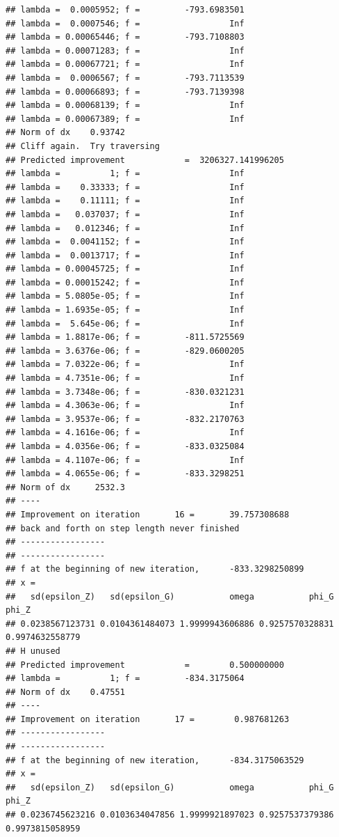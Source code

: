 \documentclass[12pt,a4paper,]{article}
\newcommand{\0}{\mathbf{0}}
\begin{document}
\begin{verbatim}
## lambda =  0.0005952; f =         -793.6983501 
## lambda =  0.0007546; f =                  Inf 
## lambda = 0.00065446; f =         -793.7108803 
## lambda = 0.00071283; f =                  Inf 
## lambda = 0.00067721; f =                  Inf 
## lambda =  0.0006567; f =         -793.7113539 
## lambda = 0.00066893; f =         -793.7139398 
## lambda = 0.00068139; f =                  Inf 
## lambda = 0.00067389; f =                  Inf 
## Norm of dx    0.93742
## Cliff again.  Try traversing
## Predicted improvement            =  3206327.141996205
## lambda =          1; f =                  Inf 
## lambda =    0.33333; f =                  Inf 
## lambda =    0.11111; f =                  Inf 
## lambda =   0.037037; f =                  Inf 
## lambda =   0.012346; f =                  Inf 
## lambda =  0.0041152; f =                  Inf 
## lambda =  0.0013717; f =                  Inf 
## lambda = 0.00045725; f =                  Inf 
## lambda = 0.00015242; f =                  Inf 
## lambda = 5.0805e-05; f =                  Inf 
## lambda = 1.6935e-05; f =                  Inf 
## lambda =  5.645e-06; f =                  Inf 
## lambda = 1.8817e-06; f =         -811.5725569 
## lambda = 3.6376e-06; f =         -829.0600205 
## lambda = 7.0322e-06; f =                  Inf 
## lambda = 4.7351e-06; f =                  Inf 
## lambda = 3.7348e-06; f =         -830.0321231 
## lambda = 4.3063e-06; f =                  Inf 
## lambda = 3.9537e-06; f =         -832.2170763 
## lambda = 4.1616e-06; f =                  Inf 
## lambda = 4.0356e-06; f =         -833.0325084 
## lambda = 4.1107e-06; f =                  Inf 
## lambda = 4.0655e-06; f =         -833.3298251 
## Norm of dx     2532.3
## ----
## Improvement on iteration       16 =       39.757308688
## back and forth on step length never finished
## -----------------
## -----------------
## f at the beginning of new iteration,      -833.3298250899 
## x =
##   sd(epsilon_Z)   sd(epsilon_G)           omega           phi_G           phi_Z 
## 0.0238567123731 0.0104361484073 1.9999943606886 0.9257570328831 0.9974632558779 
## H unused
## Predicted improvement            =        0.500000000
## lambda =          1; f =         -834.3175064 
## Norm of dx    0.47551
## ----
## Improvement on iteration       17 =        0.987681263
## -----------------
## -----------------
## f at the beginning of new iteration,      -834.3175063529 
## x =
##   sd(epsilon_Z)   sd(epsilon_G)           omega           phi_G           phi_Z 
## 0.0236745623216 0.0103634047856 1.9999921897023 0.9257537379386 0.9973815058959 

\end{verbatim}
\end{document}
